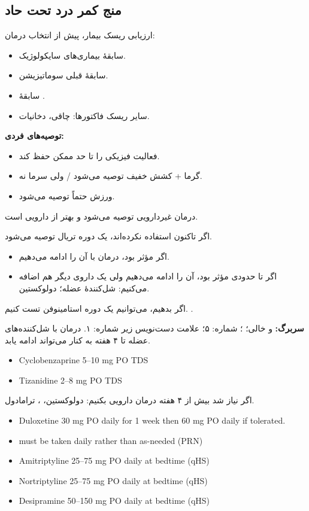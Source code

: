 \documentclass[12pt,a4paper]{article}
\begin{document}
\subsection*{منج کمر درد تحت حاد}
ارزیابی ریسک بیمار، پیش از انتخاب درمان:
\begin{itemize}
  \item سابقهٔ بیماری‌های سایکولوژیک.
  \item سابقهٔ قبلی سوماتیزیشن.
  \item سابقهٔ .
  \item سایر ریسک فاکتورها: چاقی، دخانیات.
\end{itemize}
\textbf{توصیه‌های فردی:}
\begin{itemize}
  \item فعالیت فیزیکی را تا حد ممکن حفظ کند.
  \item گرما + کشش خفیف توصیه می‌شود / ولی سرما نه.
  \item ورزش حتماً توصیه می‌شود.
\end{itemize}
درمان غیردارویی توصیه می‌شود و بهتر از دارویی است.

اگر تاکنون  استفاده نکرده‌اند، یک دوره تریال  توصیه می‌شود.
\begin{itemize}
  \item اگر مؤثر بود، درمان با آن را ادامه می‌دهیم.
  \item اگر تا حدودی مؤثر بود، آن را ادامه می‌دهیم ولی یک داروی دیگر هم اضافه می‌کنیم:
  شل‌کنندهٔ عضله؛ دولوکستین.
\end{itemize}
اگر   بدهیم، می‌توانیم یک دوره استامینوفن تست کنیم.
.

\textbf{سربرگ:}  و  خالی؛ ؛ شماره: ۵؛ علامت دست‌نویس زیر شماره: ۱.
درمان با شل‌کننده‌های عضله تا ۴ هفته به کنار  می‌تواند ادامه یابد.
\begin{latin}
\begin{itemize}
  \item Cyclobenzaprine 5--10 mg PO TDS
  \item Tizanidine 2--8 mg PO TDS
\end{itemize}
\end{latin}
اگر نیاز شد بیش از ۴ هفته درمان دارویی بکنیم: دولوکستین، ، ترامادول.

\begin{latin}
\begin{itemize}
  \item Duloxetine 30 mg PO daily for 1 week then 60 mg PO daily if tolerated.
  \item must be taken daily rather than as-needed (PRN)
  \item Amitriptyline 25--75 mg PO daily at bedtime (qHS)
  \item Nortriptyline 25--75 mg PO daily at bedtime (qHS)
  \item Desipramine 50--150 mg PO daily at bedtime (qHS)
\end{itemize}
\end{latin}
\end{document}
